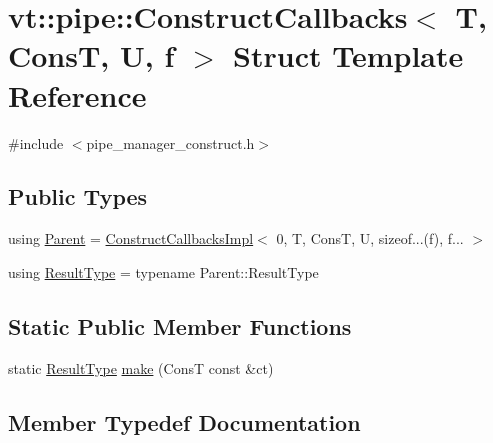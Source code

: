 \hypertarget{structvt_1_1pipe_1_1_construct_callbacks}{}\section{vt\+:\+:pipe\+:\+:Construct\+Callbacks$<$ T, ConsT, U, f $>$ Struct Template Reference}
\label{structvt_1_1pipe_1_1_construct_callbacks}


{\ttfamily \#include $<$pipe\+\_\+manager\+\_\+construct.\+h$>$}

\subsection*{Public Types}
\begin{DoxyCompactItemize}
\item 
using \hyperlink{structvt_1_1pipe_1_1_construct_callbacks_a9d1506b31e3540964dc64a5a63497205}{Parent} = \hyperlink{structvt_1_1pipe_1_1_construct_callbacks_impl}{Construct\+Callbacks\+Impl}$<$ 0, T, ConsT, U, sizeof...(f), f... $>$
\item 
using \hyperlink{structvt_1_1pipe_1_1_construct_callbacks_afadffbdf96d7bf4f83498ef255815119}{Result\+Type} = typename Parent\+::\+Result\+Type
\end{DoxyCompactItemize}
\subsection*{Static Public Member Functions}
\begin{DoxyCompactItemize}
\item 
static \hyperlink{structvt_1_1pipe_1_1_construct_callbacks_afadffbdf96d7bf4f83498ef255815119}{Result\+Type} \hyperlink{structvt_1_1pipe_1_1_construct_callbacks_ac2f7f0160104776816dca1bcc8602ee1}{make} (ConsT const \&ct)
\end{DoxyCompactItemize}


\subsection{Member Typedef Documentation}
\mbox{\label{structvt_1_1pipe_1_1_construct_callbacks_a9d1506b31e3540964dc64a5a63497205}} 
